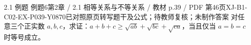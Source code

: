 \par\noindent\begin{minipage}{\linewidth}
\begin{bankitem}{2.1 例题 例题6}{第2章 / 2.1 相等关系与不等关系 / 教材 p.39 / PDF 第46页}{XJ-B1-C02-EX-P039-Y0870}{已对照原页转写题干及公式；待教师复核；未制作答案}
对任意三个正实数 $a,b,c$，求证：$a+b+c\ge\sqrt{ab}+\sqrt{bc}+\sqrt{ca}$，当且仅当 $a=b=c$ 时等号成立。
\end{bankitem}
\end{minipage}\par\medskip

